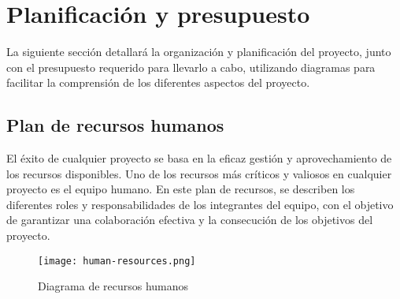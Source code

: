 \section{Planificación y presupuesto}
La siguiente sección detallará la organización y planificación del proyecto,
junto con el presupuesto requerido para llevarlo a cabo, utilizando diagramas
para facilitar la comprensión de los diferentes aspectos del proyecto.

\subsection{Plan de recursos humanos}
El éxito de cualquier proyecto se basa en la eficaz gestión y aprovechamiento
de los recursos disponibles. Uno de los recursos más críticos y valiosos en
cualquier proyecto es el equipo humano. En este plan de recursos, se describen
los diferentes roles y responsabilidades de los integrantes del equipo, con el
objetivo de garantizar una colaboración efectiva y la consecución de los
objetivos del proyecto.

\begin{figure}[ht]
    \centering
    \texttt{[image: human-resources.png]}
    \caption{Diagrama de recursos humanos}\label{fig:human-resources}
\end{figure}

